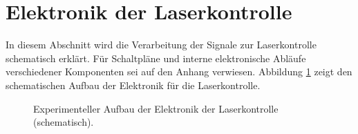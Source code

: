 \section{Elektronik der Laserkontrolle}\label{sec:elektronik_laserkontrolle} In
diesem Abschnitt wird die Verarbeitung der Signale zur Laserkontrolle schematisch erklärt. Für
Schaltpläne und interne elektronische Abläufe verschiedener Komponenten sei auf
den Anhang verwiesen. Abbildung \ref{fig:experimenteller_aufbau_elektronik_laserkontrolle} zeigt den
schematischen Aufbau der Elektronik für die Laserkontrolle.\par
\begin{figure}[h]
 	\centering
	\caption[Experimenteller Aufbau der Laserkontollelektronik,
	schematisch]{Experimenteller Aufbau der Elektronik der Laserkontrolle
	(schematisch).}
	\label{fig:experimenteller_aufbau_elektronik_laserkontrolle}
\end{figure}

